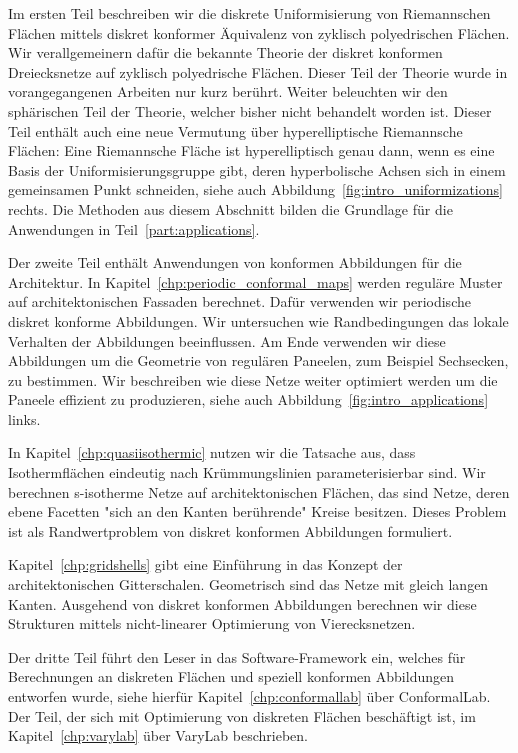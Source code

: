\documentclass[Thesis.tex]{subfiles}
\begin{document}
Im ersten Teil beschreiben wir die diskrete Uniformisierung von Riemannschen Fl\"{a}chen mittels diskret konformer \"{A}quivalenz von zyklisch polyedrischen Fl\"{a}chen.
Wir verallgemeinern daf\"{u}r die bekannte Theorie der diskret konformen Dreiecksnetze auf zyklisch polyedrische Fl\"{a}chen.
Dieser Teil der Theorie wurde in vorangegangenen Arbeiten nur kurz ber\"{u}hrt.
Weiter beleuchten wir den sph\"{a}rischen Teil der Theorie, welcher bisher nicht behandelt worden ist.
Dieser Teil enth\"{a}lt auch eine neue Vermutung \"{u}ber hyperelliptische Riemannsche Fl\"{a}chen: 
Eine Riemannsche Fl\"{a}che ist hyperelliptisch genau dann, wenn es eine Basis der Uniformisierungsgruppe gibt, deren hyperbolische Achsen sich in einem gemeinsamen Punkt schneiden, siehe auch Abbildung~\ref{fig:intro_uniformizations} rechts.
Die Methoden aus diesem Abschnitt bilden die Grundlage f\"{u}r die Anwendungen in Teil~\ref{part:applications}.

Der zweite Teil enth\"{a}lt Anwendungen von konformen Abbildungen f\"{u}r die Architektur.
In Kapitel~\ref{chp:periodic_conformal_maps} werden regul\"{a}re Muster auf architektonischen Fassaden berechnet.
Daf\"{u}r verwenden wir periodische diskret konforme Abbildungen.
Wir untersuchen wie Randbedingungen das lokale Verhalten der Abbildungen beeinflussen.
Am Ende verwenden wir diese Abbildungen um die Geometrie von regul\"{a}ren Paneelen, zum Beispiel Sechsecken, zu bestimmen. 
Wir beschreiben wie diese Netze weiter optimiert werden um die Paneele effizient zu produzieren, siehe auch Abbildung~\ref{fig:intro_applications} links.

In Kapitel~\ref{chp:quasiisothermic} nutzen wir die Tatsache aus, dass Isothermfl\"{a}chen eindeutig nach Kr\"{u}mmungslinien parameterisierbar sind.
Wir berechnen s-isotherme Netze auf architektonischen Fl\"{a}chen, das sind Netze, deren ebene Facetten "sich an den Kanten ber\"{u}hrende" Kreise besitzen.
Dieses Problem ist als Randwertproblem von diskret konformen Abbildungen formuliert.

Kapitel~\ref{chp:gridshells} gibt eine Einf\"{u}hrung in das Konzept der architektonischen Gitterschalen.
Geometrisch sind das Netze mit gleich langen Kanten.
Ausgehend von diskret konformen Abbildungen berechnen wir diese Strukturen mittels nicht-linearer Optimierung von Vierecksnetzen.

Der dritte Teil f\"{u}hrt den Leser in das Software-Framework ein, welches f\"{u}r Berechnungen an diskreten Fl\"{a}chen und speziell konformen Abbildungen entworfen wurde, siehe hierf\"{u}r Kapitel~\ref{chp:conformallab} \"{u}ber {\sc ConformalLab}.
Der Teil, der sich mit Optimierung von diskreten Fl\"{a}chen besch\"{a}ftigt ist, im Kapitel~\ref{chp:varylab} \"{u}ber {\sc VaryLab} beschrieben.
\end{document}
